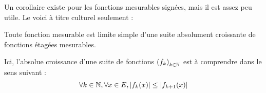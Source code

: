 \documentclass[../integ-proba.tex]{subfiles}
\begin{document}
  Un corollaire existe pour les fonctions mesurables signées, mais il est assez peu utile.
  Le voici à titre culturel seulement :

  \begin{cor}
    Toute fonction mesurable est limite simple d'une suite absolument croissante de fonctions étagées mesurables.
  \end{cor}

  \begin{rem}
    Ici, l'absolue croissance d'une suite de fonctions $\left(f_k\right)_{k\in \mathbb{N}}$ est à comprendre dans le sens suivant :
    \begin{displaymath}
      \forall k \in \mathbb{N}, \forall x \in E, \left|f_k(x)\right| \leq \left|f_{k+1}(x)\right|
    \end{displaymath}
  \end{rem}
\end{document}
